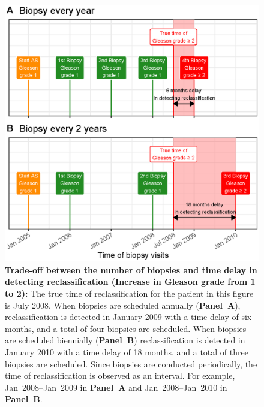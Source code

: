 \begin{figure}
\centerline{\includegraphics[width=\columnwidth]{images/delay_explanation.eps}}
\caption{\textbf{Trade-off between the number of biopsies and time delay in detecting reclassification (Increase in Gleason grade from 1 to 2):} The true time of reclassification for the patient in this figure is July 2008. When biopsies are scheduled annually (\textbf{Panel~A}), reclassification is detected in January 2009 with a time delay of six months, and a total of four biopsies are scheduled. When biopsies are scheduled biennially (\textbf{Panel~B}) reclassification is detected in January 2010 with a time delay of 18 months, and a total of three biopsies are scheduled. Since biopsies are conducted periodically, the time of reclassification is observed as an interval. For example, Jan~2008--Jan~2009 in \textbf{Panel~A} and Jan~2008--Jan~2010 in \textbf{Panel~B}.}
\label{fig:delay_explanation}
\end{figure}


